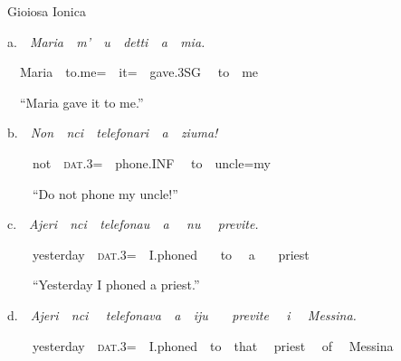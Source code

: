 \documentclass[output=paper,modfonts,nonflat]{langsci/langscibook}
\begin{document}
\begin{listWWNumviiileveli}
\item 
\begin{styleListParagraph}
\ \ Gioiosa Ionica
\end{styleListParagraph}
\end{listWWNumviiileveli}
\begin{styleListParagraph}
\ \ a.\ \ \textit{Maria\ \ m’\ \ u\ \ detti\ \ a\ \ mia.}
\end{styleListParagraph}

\begin{styleStandard}
\ \ \ \ Maria\ \ to.me=\ \ it=\ \ gave.3SG \ \ to\ \ me
\end{styleStandard}

\begin{styleStandard}
\ \ \ \ “Maria gave it to me.”
\end{styleStandard}

\begin{styleStandard}
\ \ b.\ \ \textit{Non\ \ nci\ \ telefonari\ \ a\ \ ziuma!}\ \ 
\end{styleStandard}

\begin{styleStandard}
\ \ \ \ \ \ not\ \ \textsc{dat}.3=\ \ phone.INF \ \ to\ \ uncle=my
\end{styleStandard}

\begin{styleStandard}
\ \ \ \ \ \ “Do not phone my uncle!”
\end{styleStandard}

\begin{styleStandard}
\ \ c.\ \ \textit{Ajeri\ \ nci\ \ telefonau\ \ a \ \ nu \ \ previte.}
\end{styleStandard}

\begin{styleStandard}
\ \ \ \ \ \ yesterday\ \ \textsc{dat}.3=\ \ I.phoned \ \ \ to \ \ a \ \ \ priest 
\end{styleStandard}

\begin{styleStandard}
\ \ \ \ \ \ “Yesterday I phoned a priest.”
\end{styleStandard}

\begin{styleStandard}
\ \ d.\ \ \textit{Ajeri\ \ nci \ \ telefonava\ \ a\ \ iju \ \ \ previte \ \ i \ \ Messina.}
\end{styleStandard}

\begin{styleStandard}
\ \ \ \ \ \ yesterday\ \ \textsc{dat}.3=\ \ I.phoned\ \ to\ \ that \ \ priest \ \ of \ \ Messina
\end{styleStandard}
\end{document}
